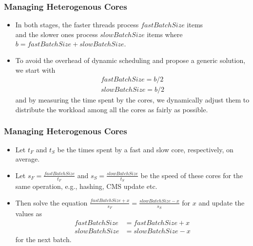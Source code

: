 \documentclass{beamer}
\begin{document}
\begin{frame}
	\frametitle{Managing Heterogenous Cores}
	\begin{itemize}
	\item	In both stages, the faster threads process $fastBatchSize$ items\\ and the slower ones process $slowBatchSize$ items where\\ 
	$b = fastBatchSize + slowBatchSize.$%
	\item To avoid the overhead of dynamic scheduling and propose a generic solution, we start with %
	\begin{align*}
	fastBatchSize = b/2 \\ %
	slowBatchSize = b/2 %
	 \end{align*}
	 and by measuring the time spent by the cores, we dynamically adjust them to distribute the workload among all the cores as fairly as possible. 
	\end{itemize}
\end{frame}

\begin{frame}
	\frametitle{Managing Heterogenous Cores}
	\begin{itemize}
	\item Let $t_F$ and $t_S$ be the times spent by a fast and slow core, respectively, on average.
	\item Let $s_F = \frac{fastBatchSize}{t_F}$ and $s_S = \frac{slowBatchSize}{t_S}$ be the speed of these cores for the same operation, e.g., hashing, CMS update etc.
	\item Then solve the equation $\frac{fastBatchSize + x}{s_F} = \frac{slowBatchSize - x}{s_S}$ for $x$ and update the values as 
	\begin{align*}
	fastBatchSize &= fastBatchSize + x\\
	slowBatchSize &= slowBatchSize - x
	\end{align*}
	for the next batch.
	\end{itemize}
\end{frame}
\end{document}
